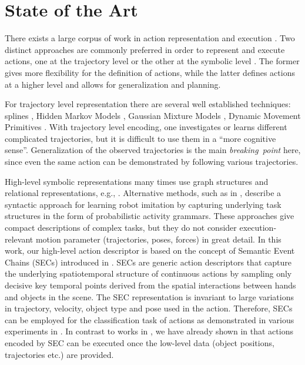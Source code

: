  
\clearpage  %
\section{State of the Art}
\label{sec:soa}

There exists a large corpus of work in action representation and execution \cite{Ijspeert2002,Ude93,Lee2006,Calinon2007}. Two distinct approaches are commonly preferred in order to represent and execute actions, one at the trajectory level \cite{Ijspeert2002} or the other at the symbolic level \cite{Dillmann2010}.
The former gives more flexibility for the definition of actions, while the latter defines actions at a higher level and allows for generalization and planning.

For trajectory level representation there are several well established techniques: splines \cite{Ude93}, Hidden Markov Models \cite{Lee2006}, Gaussian Mixture Models \cite{Calinon2007}, Dynamic Movement Primitives  \cite{Ijspeert2002,Luksch12}.
With trajectory level encoding, one investigates or learns different complicated trajectories, but it is difficult to use them in a ``more cognitive sense''. Generalization of the observed trajectories is the main {\it breaking~point} here, since even the same action can be demonstrated by following various trajectories.

High-level symbolic representations many times use graph structures and relational representations,
e.g., \cite{Pardowitz2007,Ekvall2006,Aksoy2011}. Alternative methods, such as in \cite{Lee2013}, describe a syntactic approach for learning robot imitation by capturing  underlying task structures in the form of probabilistic activity grammars. 
These approaches give compact descriptions of complex tasks,
but they do not consider execution-relevant motion parameter (trajectories, poses, forces) in great detail.
In this work, our high-level action descriptor is based on the concept of Semantic Event Chains (SECs) introduced in  \cite{Aksoy2011}. 
SECs are generic action descriptors that capture the underlying spatiotemporal structure of continuous actions by sampling only
decisive key temporal points derived from the spatial interactions between hands and objects in the scene. The
SEC representation is invariant to large variations in trajectory, velocity, object type and pose used in the action. 
Therefore, SECs can be employed for the classification task of actions as demonstrated in various experiments in  \cite{Aksoy2010,Aksoy2011,Aksoy2011b,Aksoy2013,AksoyRAS2014}. 
In contrast to works in  \cite{Pardowitz2007,Ekvall2006}, we have already shown in \cite{Aksoy2011b} that actions encoded by SEC can be executed once the low-level data (object positions, trajectories etc.) are provided. 


